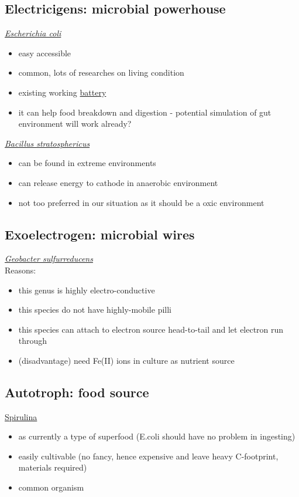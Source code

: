 \documentclass[a4paper,11pt]{article}
\begin{document}
    \subsection{Electricigens: microbial powerhouse}
    \href{https://microbewiki.kenyon.edu/index.php/Escherichia_coli}{\textit{Escherichia coli}}
    \begin{itemize}
        \item easy accessible
        \item common, lots of researches on living condition
        \item existing working \href{https://www.greenoptimistic.com/bio-battery-e-coli-20130718/}{battery}
        \item it can help food breakdown and digestion - potential simulation of gut environment will work already?
    \end{itemize}
    \href{https://microbewiki.kenyon.edu/index.php/Bacillus_stratosphericus#Applications_to_Biotechnology}{\textit{Bacillus stratosphericus}}
    \begin{itemize}
        \item can be found in extreme environments
        \item can release energy to cathode in anaerobic environment
        \item not too preferred in our situation as it should be a oxic environment
    \end{itemize}
    
    \subsection{Exoelectrogen: microbial wires}
    \href{https://microbewiki.kenyon.edu/index.php/Geobacter}{\textit{Geobacter sulfurreducens}}\autocite{reguera2005extracellular}\\
    Reasons:
    \begin{itemize}
        \item this genus is highly electro-conductive
        \item this species do not have highly-mobile pilli
        \item this species can attach to electron source head-to-tail and let electron run through
        \item (disadvantage) need Fe(II) ions in culture as nutrient source
    \end{itemize}
    
    \subsection{Autotroph: food source}
    \href{https://www.researchgate.net/publication/259495650_Spirulina_Cultivation_A_Review}{Spirulina}\autocite{usharani2012spirulina}
    \begin{itemize}
        \item as currently a type of superfood (E.coli should have no problem in ingesting)
        \item easily cultivable (no fancy, hence expensive and leave heavy C-footprint, materials required)
        \item common organism
    \end{itemize}
    
\end{document}
